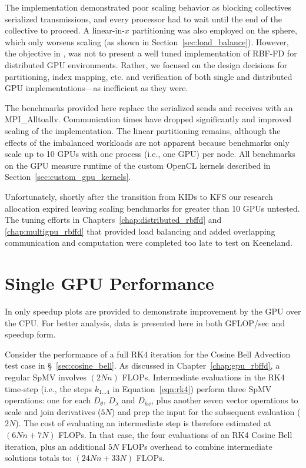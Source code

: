 The implementation demonstrated poor scaling behavior as blocking collectives serialized transmissions, and every processor had to wait until the end of the collective to proceed. A linear-in-$x$ partitioning was also employed on the sphere, which only worsens scaling (as shown in Section~\ref{sec:load_balance}). However, the objective in \cite{BolligFlyerErlebacher2012}, was not to present a well tuned implementation of RBF-FD for distributed GPU environments. Rather, we focused on the design decisions for partitioning, index mapping, etc. and verification of both single and distributed GPU implementations---as inefficient as they were. 

The benchmarks provided here replace the serialized sends and receives with an MPI\_Alltoallv. Communication times have dropped significantly and improved scaling of the implementation. The linear partitioning remains, although the effects of the imbalanced workloads are not apparent because benchmarks only scale up to 10 GPUs with one process (i.e., one GPU) per node. All benchmarks on the GPU measure runtime of the custom OpenCL kernels described in Section~\ref{sec:custom_gpu_kernels}.  

Unfortunately, shortly after the transition from KIDs to KFS our research allocation expired leaving scaling benchmarks for greater than 10 GPUs untested. The tuning efforts in Chapters~\ref{chap:distributed_rbffd} and \ref{chap:multigpu_rbffd} that provided load balancing and added overlapping communication and computation were completed too late to test on Keeneland. 


\section{Single GPU Performance} 

In \cite{BolligFlyerErlebacher2012} only speedup plots are provided to demonstrate improvement by the GPU over the CPU. For better analysis, data is presented here in both GFLOP/sec and speedup form. 

Consider the performance of a full RK4 iteration for the Cosine Bell Advection test case in \S~\ref{sec:cosine_bell}. As discussed in Chapter~\ref{chap:gpu_rbffd}, a regular SpMV involves $(2Nn)$ FLOPs. Intermediate evaluations in the RK4 time-step (i.e., the steps $k_{1 ... 4}$ in Equation~\ref{eqn:rk4}) perform three SpMV operations: one for each $D_{\theta}$, $D_{\lambda}$ and $D_{hv}$, plus another seven vector operations to scale and join derivatives ($5N$) and prep the input for the subsequent evaluation ($2N$). The cost of evaluating an intermediate step is therefore estimated at $(6Nn + 7N)$ FLOPs. In that case, the four evaluations of an RK4 Cosine Bell iteration, plus an additional $5N$ FLOPs overhead to combine intermediate solutions totals to: $(24Nn + 33N)$ FLOPs. 

